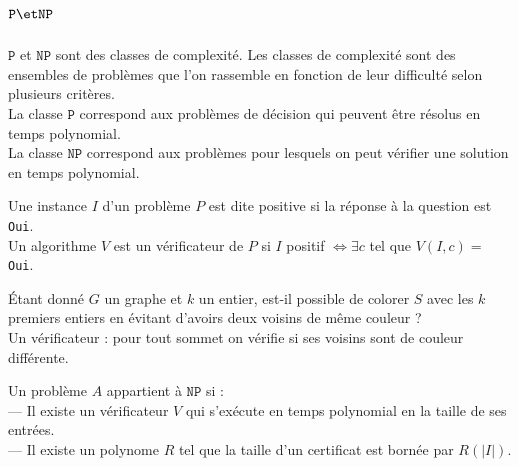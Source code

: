 \documentclass[french, 11pt]{article}
\renewcommand*{\P}{\texttt{P}}
\newcommand*{\NP}{\texttt{NP}}
\begin{document}


\section{\texorpdfstring{$\P \et \NP$}{Lg}}

\begin{defi}{}{}
    $\P$ et $\NP$ sont des classes de complexité. Les classes de complexité sont des ensembles de problèmes que l'on rassemble en fonction de leur difficulté selon plusieurs critères.\\
    La classe $\P$ correspond aux problèmes de décision qui peuvent être résolus en temps polynomial.\\
    La classe $\NP$ correspond aux problèmes pour lesquels on peut vérifier une solution en temps polynomial.
\end{defi}

\vspace*{-0.6cm}

\begin{defi}{}{}
    Une instance $I$ d'un problème $P$ est dite positive si la réponse à la question est \texttt{Oui}.\\
    Un algorithme $V$ est un vérificateur de $P$ si $I$ positif $\iff \exists c$ tel que $V(I,c)=$ \texttt{Oui}. 
\end{defi}

\vspace*{-0.6cm}

\begin{ex}{}{}
    Étant donné $G$ un graphe et $k$ un entier, est-il possible de colorer $S$ avec les $k$ premiers entiers en évitant d'avoirs deux voisins de même couleur ?\\
    Un vérificateur : pour tout sommet on vérifie si ses voisins sont de couleur différente.
\end{ex}

\vspace*{-0.6cm}

\begin{defi}{}{}
    Un problème $A$ appartient à $\NP$ si :\\
    --- Il existe un vérificateur $V$ qui s'exécute en temps polynomial en la taille de ses entrées.\\
    --- Il existe un polynome $R$ tel que la taille d'un certificat est bornée par $R(|I|)$.
\end{defi}

\vspace*{-0.6cm}
\end{document}
